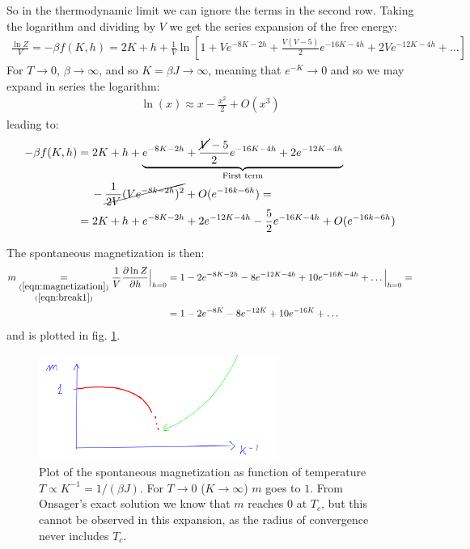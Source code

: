 \documentclass[../template.tex]{subfiles}
\begin{document}
So in the thermodynamic limit we can ignore the terms in the second row. 
Taking the logarithm and dividing by $V$ we get the series expansion of the free energy:
\begin{align*}
    \frac{\ln Z}{V} = -\beta f(K,h) = 2K + h +\frac{1}{V} \ln \left[1+ V e^{-8K-2h} + \frac{V(V-5)}{2} e^{-16K - 4h} +2V e^{-12K - 4h} + \dots \right]   
\end{align*}
For $T \to 0$, $\beta \to \infty$, and so $K = \beta J \to \infty$, meaning that $e^{-K} \to 0$ and so we may expand in series the logarithm: 
\begin{align*}
    \ln (x) \approx x -\frac{x^2}{2} + O(x^3) 
\end{align*}
leading to:
\begin{align*}
    -\beta f(K,h) &= 2K+h + \underbrace{e^{-8K-2h} + \frac{\cancel{V}-5}{2} e^{-16K-4h} +2 e^{-12K-4h}}_{\text{First term}} \\
    &\quad\>-\cancel{\frac{1}{2V} (V e^{-8k-2h})^2 }+ O(e^{-16k-6h}) =\\
    &= 2 K +h + e^{-8K -2h} + 2 e^{-12K-4h} -\frac{5}{2}e^{-16K-4h} + O(e^{-16k - 6h}) 
\end{align*}

The spontaneous magnetization is then:
\begin{align}\nonumber
    m \underset{\substack{(\ref{eqn:magnetization})\\(\ref{eqn:break1})}}{=} \frac{1}{V} \pdv{\ln Z}{h} \Big|_{h=0} &= 1 -2 e^{-8K-2h}  -8e^{-12K-4h} + 10 e^{-16K-4h} + \dots \Big|_{h=0} =\\
    &= 1 - 2e^{-8K} -8 e^{-12K} + 10e^{-16K} + \dots \label{eqn:m-low}
\end{align}
and is plotted in fig. \ref{fig:m-expansion}.

\begin{figure}[H]
    \centering
    \includegraphics[width=0.7\textwidth]{image027.png}
    \caption{Plot of the spontaneous magnetization as function of temperature $T \propto K^{-1} = 1/(\beta J)$. For $T \to 0$ ($K \to \infty$) $m$ goes to $1$. From Onsager's exact solution we know that $m$ reaches $0$ at $T_c$, but this cannot be observed in this expansion, as the radius of convergence never includes $T_c$. \label{fig:m-expansion}}
\end{figure}
\end{document}
